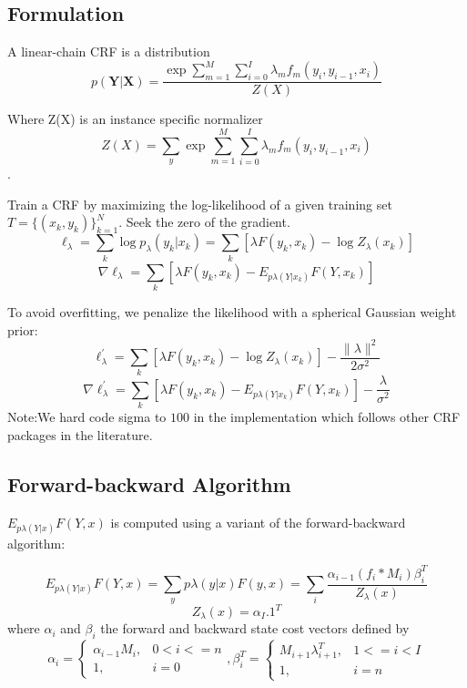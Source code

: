 \subsection{Formulation}
A linear-chain CRF \cite{DBLP:conf/naacl/ShaP03} is a distribution
    \[p(\boldsymbol Y | \boldsymbol X) = \frac{\exp{\sum_{m=1}^M \sum_{i=0}^{I} \lambda_m f_m(y_i,y_{i-1},x_i)}}{Z(X)}\]

Where Z(X) is an instance specific normalizer
\[Z(X) = \sum_{y} \exp{\sum_{m=1}^M \sum_{i=0}^{I} \lambda_m f_m(y_i,y_{i-1},x_i)}\].

Train a CRF by maximizing the log-likelihood of a given training set $ T=\{(x_k,y_k)\}_{k=1}^N$.
Seek the zero of the gradient.\\
    \[\ell_{\lambda}=\sum_k \log p_\lambda(y_k|x_k) =\sum_k[\lambda F(y_k,x_k)-\log Z_\lambda(x_k)]\]
    \[\nabla \ell_{\lambda}=\sum_k[\lambda F(y_k,x_k)-E_{p\lambda(Y|x_k)}F(Y,x_k)]\]

To avoid overfitting, we penalize the likelihood with a spherical Gaussian weight prior:\\
    \[\ell_{\lambda}^\prime=\sum_k[\lambda F(y_k,x_k)-\log Z_\lambda(x_k)]-\frac{\lVert \lambda \rVert^2}{2\sigma ^2}\]
    \[\nabla \ell_{\lambda}^\prime=\sum_k[\lambda F(y_k,x_k)-E_{p\lambda(Y|x_k)}F(Y,x_k)]-\frac{\lambda}{\sigma ^2}\]
Note:We hard code sigma to $100$ in the implementation which follows other CRF packages in the literature.

\subsection{Forward-backward Algorithm}
$E_{p\lambda(Y|x)}F(Y,x)$ is computed using a variant of the forward-backward algorithm:

    \[E_{p\lambda(Y|x)}F(Y,x) = \sum_y p\lambda(y|x)F(y,x) = \sum_i\frac{\alpha_{i-1}(f_i*M_i)\beta_i^T}{Z_\lambda(x)}\]
    \[Z_\lambda(x) = \alpha_I.1^T\]
    where $\alpha_i$ and $\beta_i$ the forward and backward state cost vectors defined by\\
  \[\alpha_i = 
    \begin{cases}
    \alpha_{i-1}M_i, & 0<i<=n\\
    1, & i=0
    \end{cases}
    ,
    \beta_i^T = 
    \begin{cases}
    M_{i+1}\lambda_{i+1}^T, & 1<=i<I\\
    1, & i=n
    \end{cases}
  \]

